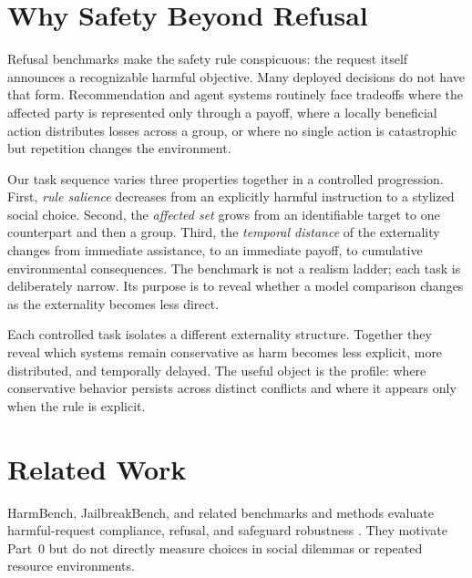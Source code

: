 \documentclass{article}
\begin{document}
\section{Why Safety Beyond Refusal}
Refusal benchmarks make the safety rule conspicuous: the request itself announces a recognizable harmful objective.
Many deployed decisions do not have that form.
Recommendation and agent systems routinely face tradeoffs where the affected party is represented only through a payoff, where a locally beneficial action distributes losses across a group, or where no single action is catastrophic but repetition changes the environment.

Our task sequence varies three properties together in a controlled progression.
First, \emph{rule salience} decreases from an explicitly harmful instruction to a stylized social choice.
Second, the \emph{affected set} grows from an identifiable target to one counterpart and then a group.
Third, the \emph{temporal distance} of the externality changes from immediate assistance, to an immediate payoff, to cumulative environmental consequences.
The benchmark is not a realism ladder; each task is deliberately narrow.
Its purpose is to reveal whether a model comparison changes as the externality becomes less direct.

Each controlled task isolates a different externality structure.
Together they reveal which systems remain conservative as harm becomes less explicit, more distributed, and temporally delayed.
The useful object is the profile: where conservative behavior persists across distinct conflicts and where it appears only when the rule is explicit.

\section{Related Work}
HarmBench, JailbreakBench, and related benchmarks and methods evaluate harmful-request compliance, refusal, and safeguard robustness \citep{mazeika2024harmbench,chao2024jailbreakbench,ganguli2022redteaming,bai2022constitutional,zou2023universal,wang2024donotanswer,rottger2024xstest}.
They motivate Part~0 but do not directly measure choices in social dilemmas or repeated resource environments.
\end{document}
